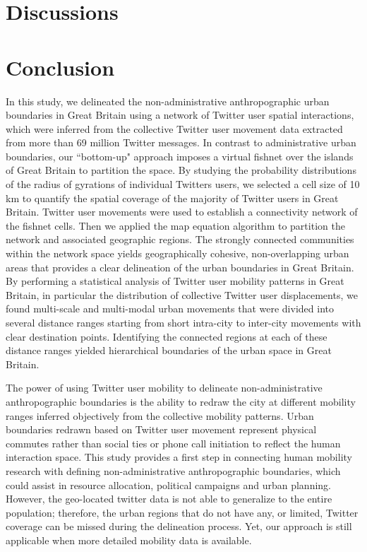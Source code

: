 \documentclass[]{tGIS2e}
\begin{document}
\section{Discussions}

\section{Conclusion}
In this study, we delineated the non-administrative anthropographic urban boundaries in Great Britain using a network of Twitter user spatial interactions, which were inferred from the collective Twitter user movement data extracted from more than 69 million Twitter messages.
In contrast to administrative urban boundaries, our ``bottom-up" approach imposes a virtual fishnet over the islands of Great Britain to partition the space.
By studying the probability distributions of the radius of gyrations of individual Twitters users, we selected a cell size of 10 km to quantify the spatial coverage of the majority of Twitter users in Great Britain. 
Twitter user movements were used to establish a connectivity network of the fishnet cells.
Then we applied the map equation algorithm to partition the network and associated geographic regions.
The strongly connected communities within the network space yields geographically cohesive, non-overlapping urban areas that provides a clear delineation of the urban boundaries in Great Britain.
By performing a statistical analysis of Twitter user mobility patterns in Great Britain, in particular the distribution of collective Twitter user displacements, we found multi-scale and multi-modal urban movements that were divided into several distance ranges starting from short intra-city to inter-city movements with clear destination points.
Identifying the connected regions at each of these distance ranges yielded hierarchical boundaries of  the urban space in Great Britain.

The power of using Twitter user mobility to delineate non-administrative anthropographic boundaries is the ability to redraw the city at different mobility ranges inferred objectively from the collective mobility patterns. 
Urban boundaries redrawn based on Twitter user movement represent physical commutes rather than social ties or phone call initiation to reflect the human interaction space.
This study provides a first step in connecting human mobility research with defining non-administrative anthropographic boundaries, which could assist in resource allocation, political campaigns and urban planning.
However, the geo-located twitter data is not able to generalize to the entire population; therefore, the urban regions that do not have any, or limited, Twitter coverage can be missed during the delineation process.
Yet, our approach is still applicable when more detailed mobility data is available. 
\end{document}
